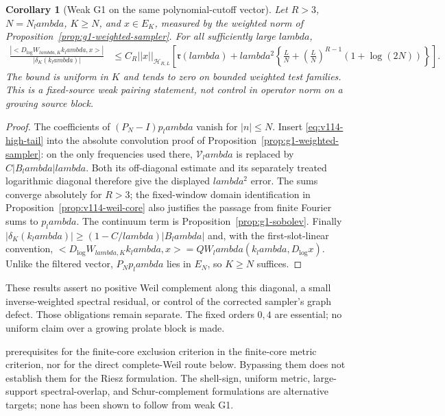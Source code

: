 \documentclass[11pt]{article}
\def\lambda{lambda}%
\def\norm#1{||#1||}%
\def\ip#1#2{<#1,#2>}%
\newtheorem{corollary}[theorem]{Corollary}
\theoremstyle{remark}
\newcommand{\norm}[1]{\left\lVert #1\right\rVert}
\newcommand{\ip}[2]{\left\langle #1,#2\right\rangle}
\begin{document}
\begin{corollary}[Weak G1 on the same polynomial-cutoff vector]
\label{cor:v114-polynomial-g1}
Let $R>3$, $N=N_\lambda$, $K\ge N$, and $x\in E_K$, measured by
the weighted norm of Proposition~\ref{prop:g1-weighted-sampler}.
For all sufficiently large $\lambda$,
\begin{align}
 \frac{|\ip{D_{\log}W_{\lambda,K}k_\lambda}{x}|}
      {|\delta_K(k_\lambda)|}
 &\le C_R\norm x_{\mathcal H_{R,L}}
 \left[\mathfrak r(\lambda)+\lambda^2
 \left\{\frac LN+\left(\frac LN\right)^{R-1}
                   (1+\log(2N))\right\}\right].
 \label{eq:v114-polynomial-g1}
\end{align}
The bound is uniform in $K$ and tends to zero on bounded weighted test
families. This is a fixed-source weak pairing statement, not control
in operator norm on a growing source block.
\end{corollary}
\begin{proof}
The coefficients of $(P_N-I)p_\lambda$ vanish for $|n|\le N$.
Insert \eqref{eq:v114-high-tail} into the absolute convolution proof
of Proposition~\ref{prop:g1-weighted-sampler}: on the only frequencies
used there, $\mathcal V_\lambda$ is replaced by $C|B_\lambda|\lambda$.
Both its off-diagonal estimate and its separately treated logarithmic
diagonal therefore give the displayed $\lambda^2$ error. The sums
converge absolutely for $R>3$; the fixed-window domain identification
in Proposition~\ref{prop:v114-weil-core} also justifies the passage
from finite Fourier sums to $p_\lambda$.
The continuum term is Proposition~\ref{prop:g1-sobolev}. Finally
$|\delta_K(k_\lambda)|\ge(1-C/\lambda)|B_\lambda|$ and, with the
first-slot-linear convention,
$\ip{D_{\log}W_{\lambda,K}k_\lambda}{x}
=QW_\lambda(k_\lambda,D_{\log}x)$.
Unlike the filtered vector, $P_Np_\lambda$ lies in $E_N$, so $K\ge N$
suffices.
\end{proof}

These results assert no positive Weil complement along this diagonal,
a small inverse-weighted spectral residual, or control of the corrected
sampler's graph defect. Those obligations remain separate. The fixed
orders $0,4$ are essential; no uniform claim over a growing prolate block
is made.


prerequisites for the finite-core exclusion criterion in
the finite-core metric criterion, nor for the direct complete-Weil
route below. Bypassing them does not establish them for the Riesz
formulation. The shell-sign, uniform metric, large-support
spectral-overlap, and Schur-complement formulations are alternative
targets; none has been shown to follow from weak G1.
\end{document}
